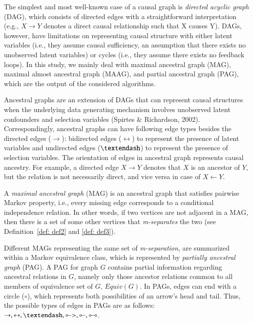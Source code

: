 \documentclass[11pt]{article}
\theoremstyle{definition}
\begin{document}
The simplest and most well-known case of a causal graph is \textit{directed acyclic graph} (DAG), which consists of directed edges with a straightforward interpretation (e.g., $X\rightarrow Y$ denotes a direct causal relationship such that X causes Y). DAGs, however, have limitations on representing causal structure with either latent variables (i.e., they assume causal sufficiency, an assumption that there exists no unobserved latent variables) or cycles (i.e., they assume there exists no feedback loops). In this study, we mainly deal with maximal ancestral graph (MAG), maximal almost ancestral graph (MAAG), and partial ancestral graph (PAG), which are the output of the considered algorithms. 

Ancestral graphs are an extension of DAGs that can represent causal structures when the underlying data generating mechanism involves unobserved latent confounders and selection variables (Spirtes \& Richardson, 2002). Correspondingly, ancestral graphs can have following edge types besides the directed edges ($\rightarrow$): bidirected edges ($\leftrightarrow$) to represent the presence of latent variables and undirected edges ($\textendash$) to represent the presence of selection variables. The orientation of edges in ancestral graph represents causal ancestry. For example, a directed edge $X \rightarrow Y$ denotes that $X$ is an ancestor of $Y$, but the relation is not necessarily direct, and vice versa in case of $X \leftarrow Y$. 

A \textit{maximal ancestral graph} (MAG) is an ancestral graph that satisfies pairwise Markov property, i.e., every missing edge corresponds to a conditional independence relation. In other words, if two vertices are not adjacent in a MAG, then there is a set of some other vertices that \textit{m-separates} the two (see Definition~\ref{def: def2} and \ref{def: def3}). 

Different MAGs representing the same set of \textit{m-separation}, are summarized within a Markov equivalence class, which is represented by \textit{partially ancestral graph} (PAG). A PAG for graph $G$ contains partial information regarding ancestral relations in $G$, namely only those ancestor relations common to all members of equivalence set of $G$, $Equiv(G)$. In PAGs, edges can end with a circle ($\circ$), which represents both possibilities of an arrow's head and tail. Thus, the possible types of edges in PAGs are as follows: $\rightarrow, \leftrightarrow, \textendash, \multimapinv>, \multimapinv, \multimapboth$. %
\end{document}
